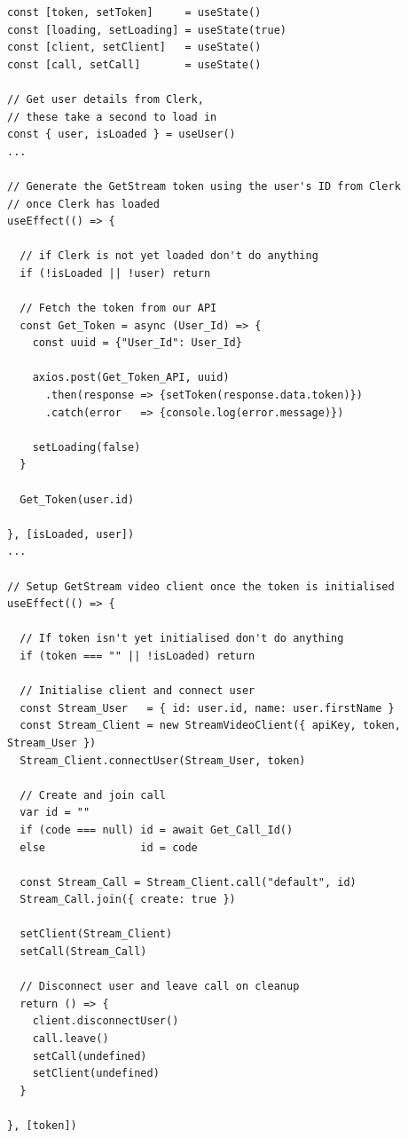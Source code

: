 \begin{verbatim}
const [token, setToken]     = useState()
const [loading, setLoading] = useState(true)
const [client, setClient]   = useState()
const [call, setCall]       = useState()

// Get user details from Clerk,
// these take a second to load in
const { user, isLoaded } = useUser()
...

// Generate the GetStream token using the user's ID from Clerk
// once Clerk has loaded
useEffect(() => {

  // if Clerk is not yet loaded don't do anything
  if (!isLoaded || !user) return

  // Fetch the token from our API
  const Get_Token = async (User_Id) => {
    const uuid = {"User_Id": User_Id}

    axios.post(Get_Token_API, uuid)
      .then(response => {setToken(response.data.token)})
      .catch(error   => {console.log(error.message)})

    setLoading(false)
  }

  Get_Token(user.id)

}, [isLoaded, user])
...

// Setup GetStream video client once the token is initialised
useEffect(() => {

  // If token isn't yet initialised don't do anything
  if (token === "" || !isLoaded) return

  // Initialise client and connect user
  const Stream_User   = { id: user.id, name: user.firstName }
  const Stream_Client = new StreamVideoClient({ apiKey, token, Stream_User })
  Stream_Client.connectUser(Stream_User, token)

  // Create and join call
  var id = ""
  if (code === null) id = await Get_Call_Id()
  else               id = code

  const Stream_Call = Stream_Client.call("default", id)
  Stream_Call.join({ create: true })

  setClient(Stream_Client)
  setCall(Stream_Call)

  // Disconnect user and leave call on cleanup
  return () => {
    client.disconnectUser()
    call.leave()
    setCall(undefined)
    setClient(undefined)
  }

}, [token])
\end{verbatim}

{\color{gray} \hrulefill} \\ \vspace{0.2cm}

